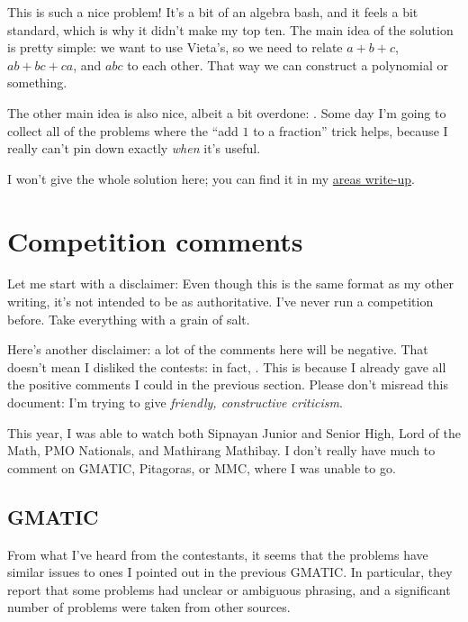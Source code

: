 \documentclass[11pt,paper=letter]{scrartcl}
\begin{document}
This is such a nice problem! It's a bit of an algebra bash, and it feels a bit standard, which is why it didn't make my top ten. The main idea of the solution is pretty simple: we want to use Vieta's, so we need to relate $a + b + c$, $ab + bc + ca$, and $abc$ to each other. That way we can construct a polynomial or something.

The other main idea is also nice, albeit a bit overdone: . Some day I'm going to collect all of the problems where the ``add $1$ to a fraction'' trick helps, because I really can't pin down exactly \emph{when} it's useful. 

I won't give the whole solution here; you can find it in my \href{http://cjquines.com/files/pmo2019areas.pdf}{areas write-up}.

\section{Competition comments}

Let me start with a disclaimer:  Even though this is the same format as my other writing, it's not intended to be as authoritative. I've never run a competition before. Take everything with a grain of salt.

Here's another disclaimer: a lot of the comments here will be negative. That doesn't mean I disliked the contests: in fact, . This is because I already gave all the positive comments I could in the previous section. Please don't misread this document: I'm trying to give \emph{friendly, constructive criticism}.

This year, I was able to watch both Sipnayan Junior and Senior High, Lord of the Math, PMO Nationals, and Mathirang Mathibay. I don't really have much to comment on GMATIC, Pitagoras, or MMC, where I was unable to go.

\subsection{GMATIC}

From what I've heard from the contestants, it seems that the problems have similar issues to ones I pointed out in the previous GMATIC. In particular, they report that some problems had unclear or ambiguous phrasing, and a significant number of problems were taken from other sources.
\end{document}
